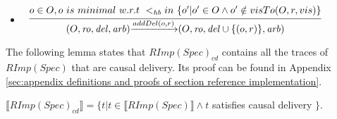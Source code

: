 \begin {itemize}
\setlength{\itemsep}{0.5pt}
\item[-] $\begin{array}{l c} \bigfrac{o \in O, o \ is \ minimal \ w.r.t \ <_{\mathit{hb}} in \ \{ o' \vert o' \in O \wedge o' \notin visTo(O,r,vis) \}} {(O,\mathit{ro},\mathit{del},\mathit{arb}) {\xrightarrow{addDel(o,r)}} (O,\mathit{ro},\mathit{del} \cup \{ (o,r) \},\mathit{arb})} \end{array}$ 
\end{itemize}

The following lemma states that $RImp(Spec)_{\mathit{cd}}$ contains all the traces of $RImp(Spec)$ that are causal delivery. Its proof can be found in Appendix \ref{sec:appendix definitions and proofs of section reference implementation}.

\begin{lemma}
\label{lemma:RImpcdSpec contains all the sequences of RImpSpec that are causal delivery}
$\llbracket RImp(Spec)_{\mathit{cd}} \rrbracket = \{ t \vert t \in \llbracket RImp(Spec) \rrbracket \wedge t$ satisfies causal delivery $\}$.
\end{lemma}




